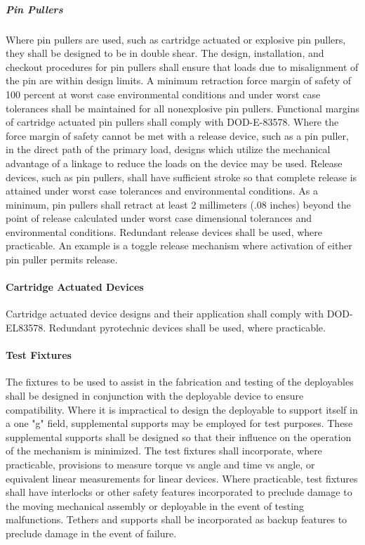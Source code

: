 \documentclass[12pt]{article}
\begin{document}
\subparagraph{Pin Pullers} %
Where pin pullers are used, such as cartridge actuated or explosive pin pullers, they shall be designed to be in double shear. 
The design, installation, and checkout procedures for pin pullers shall ensure that loads due to misalignment of the pin are within design limits. 
A minimum retraction force margin of safety of 100 percent at worst case environmental conditions and under worst case tolerances shall be maintained for all nonexplosive pin pullers. 
Functional margins of cartridge actuated pin pullers shall comply with DOD-E-83578. 
Where the force margin of safety cannot be met with a release device, such as a pin puller, in the direct path of the primary load, designs which utilize the mechanical advantage of a linkage to reduce the loads on the device may be used. 
Release devices, such as pin pullers, shall have sufficient stroke so that complete release is attained under worst case tolerances and environmental conditions. 
As a minimum, pin pullers shall retract at least 2 millimeters (.08 inches) beyond the point of release calculated under worst case dimensional tolerances and environmental conditions. 
Redundant release devices shall be used, where practicable. 
An example is a toggle release mechanism where activation of either pin puller permits release.

\paragraph{Cartridge Actuated Devices} %
Cartridge actuated device designs and their application shall comply with DOD-EL83578. 
Redundant pyrotechnic devices shall be used, where practicable.

\paragraph{Test Fixtures} %
The fixtures to be used to assist in the fabrication and testing of the deployables shall be designed in conjunction with the deployable device to ensure compatibility. 
Where it is impractical to design the deployable to support itself in a one "g" field, supplemental supports may be employed for test purposes. 
These supplemental supports shall be designed so that their influence on the operation of the mechanism is minimized. 
The test fixtures shall incorporate, where practicable, provisions to measure torque vs angle and time vs angle, or equivalent linear measurements for linear devices. 
Where practicable, test fixtures shall have interlocks or other safety features incorporated to preclude damage to the moving mechanical assembly or deployable in the event of testing malfunctions. 
Tethers and supports shall be incorporated as backup features to preclude damage in the event of failure.
\end{document}
